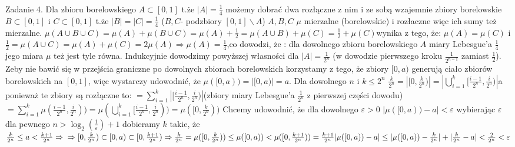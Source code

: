\documentclass{article}
\begin{document}
Zadanie 4.
\newline
\newline
Dla zbioru borelowskiego $A\subset [0,1]$ t.że $|A|=\frac{1}{4}$ możemy dobrać dwa rozłączne z nim i ze sobą wzajemnie 
zbiory borelowskie $B\subset[0,1]$ i $C\subset[0,1]$ t.że $|B|=|C|=\frac{1}{4}$ ($B,C$- podzbiory $[0,1]\backslash A$)\newline
$A,B,C$  $\mu$ mierzalne (borelowskie) i rozłaczne więc ich sumy też mierzalne.\newline
$\mu(A\cup B\cup C)=\mu(A)+\mu(B\cup C)=\mu(A)+\frac{1}{2}=\mu(A\cup B)+\mu(C)=\frac{1}{2}+\mu(C)$\quad wynika z tego, że:\newline
$\mu(A)=\mu(C)$ i $\frac{1}{2}=\mu(A\cup C)=\mu(A)+\mu(C)=2\mu(A)\Rightarrow \mu(A)=\frac{1}{4}$,\quad co dowodzi, że :\newline
dla dowolnego zbioru borelowskiego $A$ miary Lebesgue'a $\frac{1}{4}$ jego miara $\mu$ też jest tyle równa.\newline
Indukcyjnie dowodzimy powyższej własności dla $|A|=\frac{1}{2^n}$ (w dowodzie pierwszego kroku $\frac{1}{2^{n-1}}$ zamiast $\frac{1}{2}$).\newline
Zeby nie bawić się w przejścia graniczne po dowolnych zbiorach borelowskich korzystamy z tego, że zbiory $[0,a)$ generują ciało zbiorów borelowskich na $[0,1]$,
więc wystarczy udowodnić, że $\mu([0,a))=|[0,a)|=a$.\newline
Dla dowolnego $n$ i $k\le2^n$\newline
$\frac{k}{2^n}=|[0,\frac{k}{2^n})|=|\bigcup\limits_{i=1}^{k}[\frac{i-1}{2^n},\frac{i}{2^n})|$\quad\quad a ponieważ te zbiory są rozłączne to:\newline
$=\sum\limits_{i=1}^{k}|[\frac{i-1}{2^n},\frac{i}{2^n})|$\quad\quad\quad\quad (zbiory miary Lebesgue'a $\frac{1}{2^n}$ z pierwszej części dowodu)\newline
$=\sum\limits_{i=1}^{k}\mu(\frac{i-1}{2^n},\frac{i}{2^n}))=
\mu(\bigcup\limits_{i=1}^{k}[\frac{i-1}{2^n},\frac{i}{2^n}))=\mu([0,\frac{k}{2^n}))$\newline
Chcemy udowodnić, że dla dowolnego $\varepsilon>0$ $|\mu([0,a))-a|<\varepsilon$\newline
wybierając $\varepsilon$ dla  pewnego $n>\log_2(\frac{1}{\varepsilon})+1$ dobieramy $k$ takie, że $\frac{k}{2^n}\le a<\frac{k+1}{2^n}\Rightarrow\newline
\Rightarrow[0,\frac{k}{2^n})\subset[0,a)\subset[0,\frac{k+1}{2^n})\Rightarrow
\frac{k}{2^n}=\mu([0,\frac{k}{2^n}))\le\mu([0,a))<\mu([0,\frac{k+1}{2^n}))=\frac{k+1}{2^n}\newline
|\mu([0,a))-a|\le|\mu([0,a))-\frac{k}{2^n}|+|\frac{k}{2^n}-a|<\frac{2}{2^n}<\varepsilon$\newpage
\end{document}
